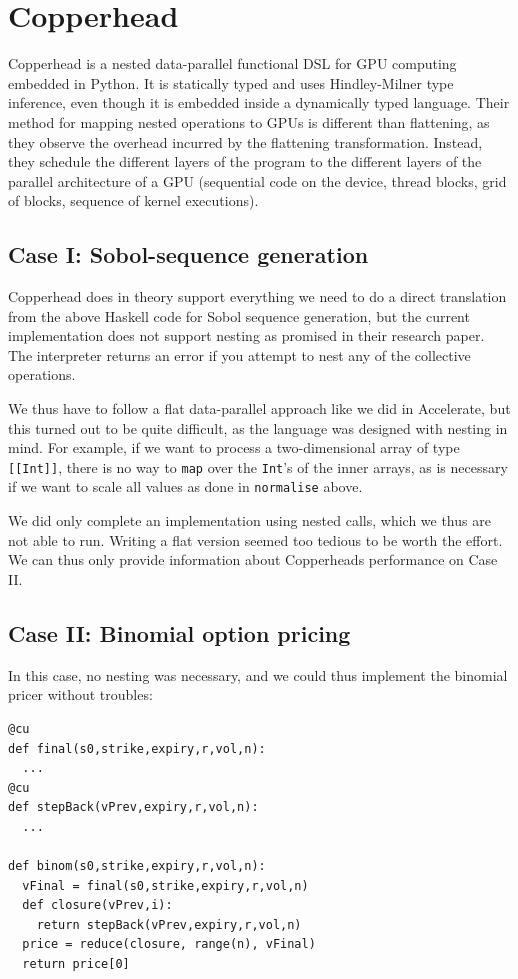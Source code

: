 \documentclass[preprint]{sigplanconf}
\begin{document}
\section{Copperhead}
Copperhead is a nested data-parallel functional DSL for GPU computing
embedded in Python. It is statically typed and uses Hindley-Milner
type inference, even though it is embedded inside a dynamically typed
language. Their method for mapping nested operations to GPUs is
different than flattening, as they observe the overhead incurred by
the flattening transformation. Instead, they schedule the different
layers of the program to the different layers of the parallel
architecture of a GPU (sequential code on the device, thread blocks,
grid of blocks, sequence of kernel executions).

\subsection{Case I: Sobol-sequence generation}
Copperhead does in theory support everything we need to do a direct
translation from the above Haskell code for Sobol sequence generation,
but the current implementation does not support nesting as promised in
their research paper. The interpreter returns an error if you attempt
to nest any of the collective operations.

We thus have to follow a flat data-parallel approach like we did in
Accelerate, but this turned out to be quite difficult, as the language
was designed with nesting in mind. For example, if we want to process
a two-dimensional array of type \verb|[[Int]]|, there is no way to
\verb|map| over the \verb|Int|'s of the inner arrays, as is
necessary if we want to scale all values as done in \verb|normalise|
above.

We did only complete an implementation using nested calls, which we
thus are not able to run. Writing a flat version seemed too tedious to
be worth the effort. We can thus only provide information about
Copperheads performance on Case II.

\subsection{Case II: Binomial option pricing}
In this case, no nesting was necessary, and we could thus implement
the binomial pricer without troubles:
\begin{verbatim}
@cu
def final(s0,strike,expiry,r,vol,n):
  ...
@cu
def stepBack(vPrev,expiry,r,vol,n):
  ...

def binom(s0,strike,expiry,r,vol,n):
  vFinal = final(s0,strike,expiry,r,vol,n)
  def closure(vPrev,i):
    return stepBack(vPrev,expiry,r,vol,n)
  price = reduce(closure, range(n), vFinal)
  return price[0]
\end{verbatim}
\end{document}
